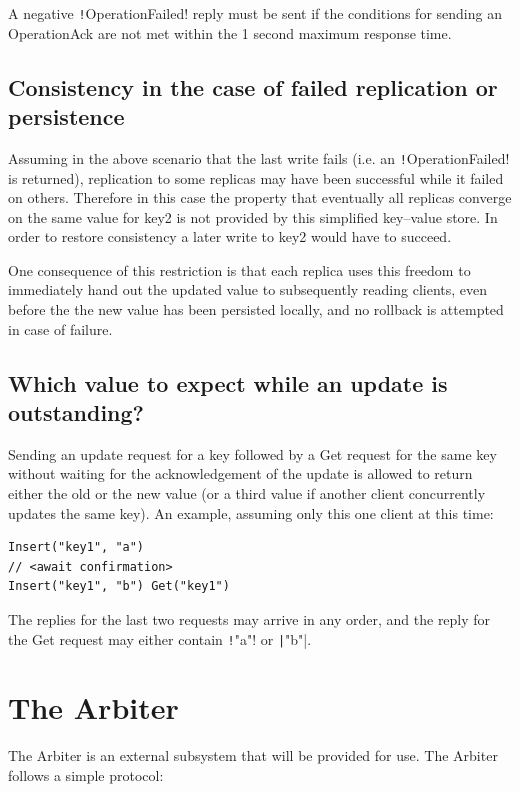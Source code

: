 \documentclass{article}
\begin{document}
A negative \texttt!OperationFailed! reply must be sent if the conditions for sending an OperationAck are not met within the 1 second maximum response time.

\subsection{Consistency in the case of failed replication or persistence}

Assuming in the above scenario that the last write fails (i.e. an \texttt!OperationFailed! is returned), replication to some replicas may have been successful while it failed on others. Therefore in this case the property that eventually all replicas converge on the same value for key2 is not provided by this simplified key–value store. In order to restore consistency a later write to key2 would have to succeed.

One consequence of this restriction is that each replica uses this  freedom to immediately hand out the updated value to subsequently  reading clients, even before the the new value has been persisted locally, and no rollback is attempted in case of failure.

\subsection{Which value to expect while an update is outstanding?}

Sending an update request for a key followed by a Get request for the same key without waiting for the acknowledgement of the update is allowed to return either the old or the new value (or a third value if another client concurrently updates the same key). An example, assuming only this one client at this time:

\begin{verbatim}
Insert("key1", "a")
// <await confirmation> 
Insert("key1", "b") Get("key1") 
\end{verbatim}

The replies for the last two requests may arrive in any order, and the reply for the Get request may either contain \texttt!"a"! or \texttt|"b"|.

\section{The Arbiter}\label{s:arbiter}

The Arbiter is an external subsystem that will be provided for use. The Arbiter follows a simple protocol:
\end{document}
